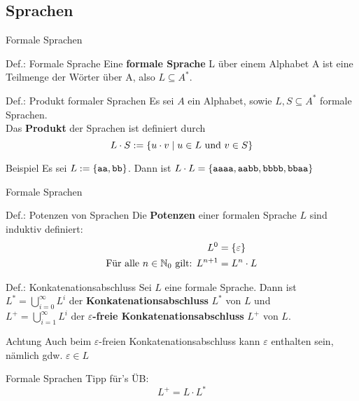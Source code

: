 \subsection{Sprachen} %
\begin{frame}{Formale Sprachen}
	\begin{block}{Def.: Formale Sprache}
		Eine \textbf{formale Sprache} L über einem Alphabet A ist eine Teilmenge der Wörter über A, also \(L \subseteq A^{*}\).
	\end{block}

	\begin{block}{Def.: Produkt formaler Sprachen}
		Es sei $A$ ein Alphabet, sowie $L,S \subseteq A^*$ formale Sprachen.\\
		Das \textbf{Produkt} der Sprachen ist definiert durch
		\[
			L \cdot S := \left\{ u \cdot v \mid u \in L \text{ und } v \in S \right\}
		\]
	\end{block}

	\begin{exampleblock}{Beispiel}
		Es sei $L:=\left\{ \texttt{aa}, \texttt{bb} \right\}$. Dann ist $L\cdot L = \left\{ \texttt{aaaa}, \texttt{aabb}, \texttt{bbbb}, \texttt{bbaa} \right\}$
	\end{exampleblock}
\end{frame}

\begin{frame}{Formale Sprachen}
	\begin{block}{Def.: Potenzen von Sprachen}
		Die \textbf{Potenzen} einer formalen Sprache $L$ sind induktiv definiert:
		\begin{align*}
			L^0 &= \left\{ \varepsilon \right\} \\
			\text{Für alle $n \in \mathbb{N}_0$ gilt: } L^{n+1} &= L^n \cdot L
		\end{align*}
	\end{block}

	\begin{block}{Def.: Konkatenationsabschluss}
		Sei $L$ eine formale Sprache. Dann ist \\
		$L^* = \bigcup_{i=0}^{\infty} L^{i}$ der \textbf{Konkatenationsabschluss} $L^*$ von $L$ und \\
		$L^+ = \bigcup_{i=1}^{\infty} L^{i}$ der \textbf{$\varepsilon$-freie Konkatenationsabschluss} $L^+$ von $L$.
	\end{block}

	\begin{alertblock}{Achtung}
		Auch beim $\varepsilon$-freien Konkatenationsabschluss kann $\varepsilon$ enthalten sein, nämlich gdw. $\varepsilon \in L$
	\end{alertblock}
\end{frame}

\begin{frame}{Formale Sprachen}
    Tipp für's ÜB:
    \[
    	L^+ = L \cdot L^*
    \]
\end{frame}